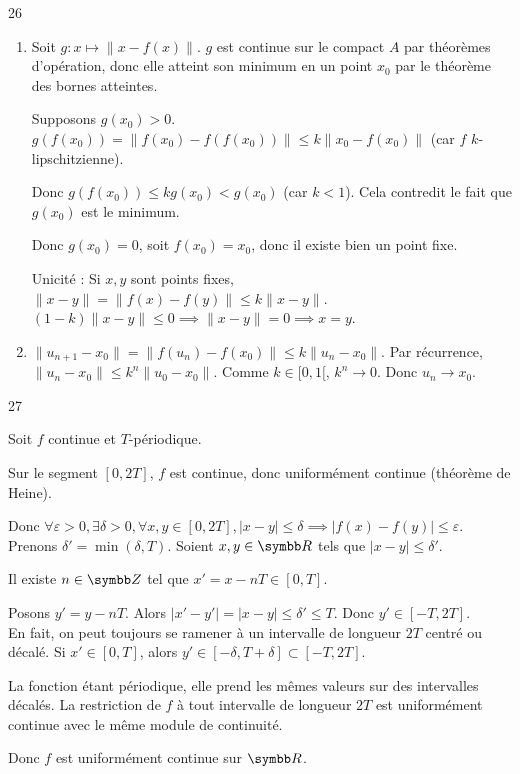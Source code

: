 \begin{correction}{26}
\begin{enumerate}
    \item Soit $g : x \mapsto \|x-f(x)\|$. $g$ est continue sur le compact $A$ par théorèmes d'opération, donc elle atteint son minimum en un point $x_{0}$ par le théorème des bornes atteintes.

    Supposons $g(x_{0}) > 0$.
    $g(f(x_{0})) = \|f(x_{0}) - f(f(x_{0}))\| \leqslant k \|x_{0} - f(x_{0})\|$ (car $f$ $k$-lipschitzienne).

    Donc $g(f(x_{0})) \leqslant k g(x_{0}) < g(x_{0})$ (car $k < 1$).
    Cela contredit le fait que $g(x_{0})$ est le minimum.

    Donc $g(x_{0}) = 0$, soit $f(x_{0}) = x_{0}$, donc il existe bien un point fixe.
    
    Unicité : Si $x, y$ sont points fixes, $\|x-y\| = \|f(x)-f(y)\| \leqslant k \|x-y\|$.
    $(1-k)\|x-y\| \leqslant 0 \implies \|x-y\| = 0 \implies x=y$.

    \item $\|u_{n+1} - x_{0}\| = \|f(u_{n}) - f(x_{0})\| \leqslant k \|u_{n} - x_{0}\|$.
    Par récurrence, $\|u_{n} - x_{0}\| \leqslant k^{n} \|u_{0} - x_{0}\|$.
    Comme $k \in [0,1[$, $k^{n} \to 0$. Donc $u_{n} \to x_{0}$.
\end{enumerate}
\end{correction}

\begin{correction}{27}

    Soit $f$ continue et $T$-périodique.

    Sur le segment $[0, 2T]$, $f$ est continue, donc uniformément continue (théorème de Heine).

    Donc $\forall \varepsilon > 0, \exists \delta > 0, \forall x,y \in [0, 2T], |x-y| \leqslant \delta \implies |f(x)-f(y)| \leqslant \varepsilon$. \\

    Prenons $\delta' = \min(\delta, T)$.
    Soient $x, y \in \R$ tels que $|x-y| \leqslant \delta'$.

    Il existe $n \in \Z$ tel que $x' = x - nT \in [0, T]$.

    Posons $y' = y - nT$. Alors $|x'-y'| = |x-y| \leqslant \delta' \leqslant T$.
    Donc $y' \in [-T, 2T]$. \\

    En fait, on peut toujours se ramener à un intervalle de longueur $2T$ centré ou décalé.
    Si $x' \in [0, T]$, alors $y' \in [-\delta, T+\delta] \subset [-T, 2T]$.

    La fonction étant périodique, elle prend les mêmes valeurs sur des intervalles décalés.
    La restriction de $f$ à tout intervalle de longueur $2T$ est uniformément continue avec le même module de continuité.

    Donc $f$ est uniformément continue sur $\R$.
\end{correction}

